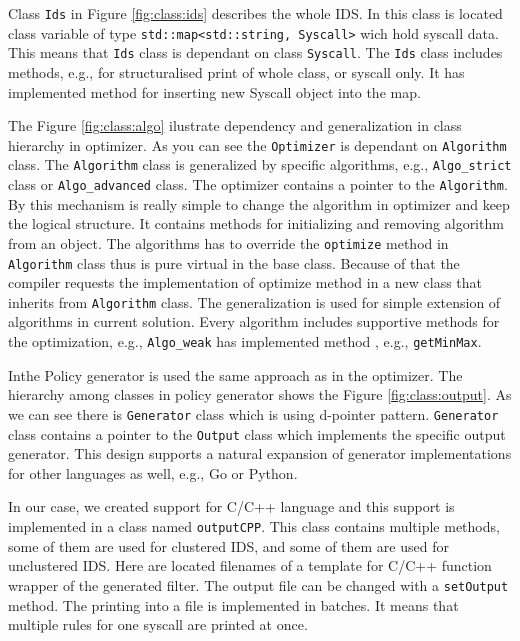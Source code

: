 Class \texttt{Ids} in Figure \ref{fig:class:ids} describes the whole IDS. In
this class is located class variable of type \texttt{std::map<std::string,
Syscall>} wich hold syscall data. This means that \texttt{Ids} class is
dependant on class \texttt{Syscall}. The \texttt{Ids} class includes methods,
e.g., for structuralised print of whole class, or syscall only. It has
implemented method for inserting new Syscall object into the map.

The Figure \ref{fig:class:algo} ilustrate dependency and generalization in class
hierarchy in optimizer. As you can see the \texttt{Optimizer} is dependant on
\texttt{Algorithm} class. The \texttt{Algorithm} class is generalized by
specific algorithms, e.g., \texttt{Algo\_strict} class or
\texttt{Algo\_advanced} class. The optimizer contains a pointer to the
\texttt{Algorithm}. By this mechanism is really simple to change the algorithm
in optimizer and keep the logical structure. It contains methods for
initializing and removing algorithm from an object. The algorithms has to
override the \texttt{optimize} method in \texttt{Algorithm} class thus is pure
virtual in the base class. Because of that the compiler requests the
implementation of optimize method in a new class that inherits from
\texttt{Algorithm} class. The generalization is used for simple extension of
algorithms in current solution. Every algorithm includes supportive methods for
the optimization, e.g., \texttt{Algo\_weak} has implemented method
, e.g., \texttt{getMinMax}.

Inthe Policy generator is used the same approach as in the optimizer. The
hierarchy among classes in policy generator shows the Figure
\ref{fig:class:output}. As we can see there is \texttt{Generator} class which is using
d-pointer pattern. \texttt{Generator} class contains a pointer to the \texttt{Output} class which
implements the specific output generator. This design supports a natural
expansion of generator implementations for other languages as well, e.g., Go or
Python.

In our case, we created support for C/C++ language and this support is
implemented in a class named \texttt{outputCPP}. This class contains multiple
methods, some of them are used for clustered IDS, and some of them are used for
unclustered IDS. Here are located filenames of a template for C/C++ function
wrapper of the generated filter. The output file can be changed with a
\texttt{setOutput} method. The printing into a file is implemented in batches.
It means that multiple rules for one syscall are printed at once.

